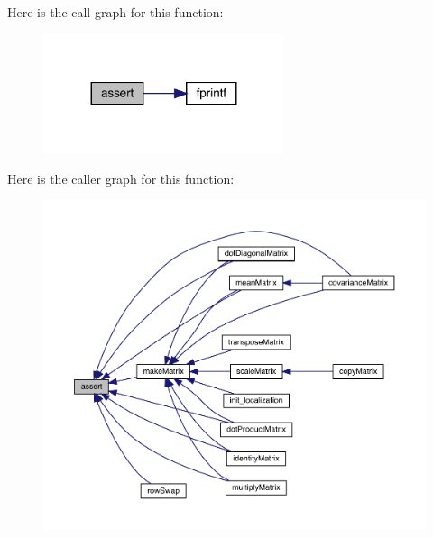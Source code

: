 Here is the call graph for this function\+:\nopagebreak
\begin{figure}[H]
\begin{center}
\leavevmode
\includegraphics[width=200pt]{matrix_8c_a8e41e30382335ea89f90b72db0b44d6f_cgraph}
\end{center}
\end{figure}
Here is the caller graph for this function\+:\nopagebreak
\begin{figure}[H]
\begin{center}
\leavevmode
\includegraphics[width=350pt]{matrix_8c_a8e41e30382335ea89f90b72db0b44d6f_icgraph}
\end{center}
\end{figure}
\mbox{\label{matrix_8c_abbb8d2d20c2dd53a2269d017a336668f}} 
